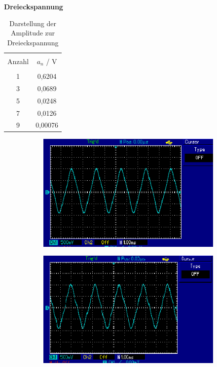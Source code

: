 \centerline{\textbf{Dreieckspannung}}
\begin{table}[H]
  \centering
  \begin{tabular}{c c}
    \toprule\\
    Anzahl & $a_n$ / V \\
    \midrule \\
    1 & 0,6204 \\
    3 & 0,0689 \\
    5 & 0,0248 \\
    7 & 0,0126 \\
    9 & 0,00076 \\
    \bottomrule
  \end{tabular}
  \caption{Darstellung der Amplitude zur Dreieckspannung}
  \label{tab:5}
\end{table}
\begin{figure}[H]
  \centering
  \begin{subfigure}{0.48\textwidth}
	\includegraphics[width=\textwidth]{Dreieckspannung/1.png}
\end{subfigure}
\begin{subfigure}{0.48\textwidth}
  \includegraphics[width=\textwidth]{Dreieckspannung/4.png}
\end{subfigure}
\end{figure}
